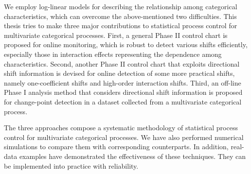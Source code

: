 We employ log-linear models for describing the relationship among categorical
characteristics, which can overcome the above-mentioned two difficulties. This
thesis tries to make three major contributions to statistical process control for
multivariate categorical processes. First, a general Phase II control chart is
proposed for online monitoring, which is robust to detect various shifts
efficiently, especially those in interaction effects representing the dependence
among characteristics. Second, another Phase II control chart that exploits
directional shift information is devised for online detection of some more practical
shifts, namely one-coefficient shifts and high-order interaction shifts. Third, an
off-line Phase I analysis method that considers directional shift information is
proposed for change-point detection in a dataset collected from a multivariate
categorical process.

The three approaches compose a systematic methodology of statistical process control
for multivariate categorical processes. We have also performed numerical simulations
to compare them with corresponding counterparts. In addition, real-data examples
have demonstrated the effectiveness of these techniques. They can be implemented
into practice with reliability.

